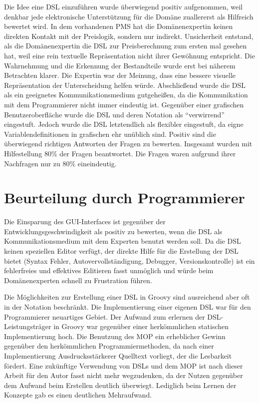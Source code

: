 \documentclass[11pt,english,ngerman, headsepline]{scrreprt}
\begin{document}
Die Idee eine DSL einzuführen wurde überwiegend positiv aufgenommen, weil
denkbar jede elektronische Unterstützung für die Domäne zuallererst als
Hilfreich bewertet wird.
In dem vorhandenen PMS hat die Domänenexpertin keinen direkten Kontakt mit der
Preislogik, sondern nur indirekt.
Unsicherheit entstand, als die Domänenexpertin die DSL zur Preisberechnung
 zum ersten mal gesehen hat, weil eine
rein textuelle Repräsentation nicht ihrer Gewöhnung entspricht. Die Wahrnehmung
und die Erkennung der Bestandteile wurde erst bei näherem Betrachten klarer. 
Die Expertin war der Meinung, dass eine bessere visuelle Repräsentation der
Unterscheidung helfen würde. Abschließend wurde die DSL als ein geeignetes
Kommunikationsmedium gutgeheißen, da die Kommunikation mit dem Programmierer nicht immer eindeutig ist.
Gegenüber einer grafischen Benutzeroberfläche wurde die DSL und deren Notation
als ``verwirrend'' eingestuft. Jedoch wurde die DSL letztendlich als flexibler
eingestuft, da eigne Variablendefinitionen in grafischen ehr unüblich sind.
Positiv sind die überwiegend richtigen Antworten der Fragen zu bewerten.
Insgesamt wurden mit Hilfestellung 80\% der Fragen beantwortet. Die Fragen waren
aufgrund ihrer Nachfragen nur zu 80\% eineindeutig.



\section{Beurteilung durch Programmierer}
 
Die Einsparung des GUI-Interfaces ist gegenüber der Entwicklungsgeschwindigkeit
als positiv zu bewerten, wenn die DSL als Kommunikationsmedium mit dem Experten
benutzt werden soll. 
Da die DSL keinen speziellen Editor verfügt, der direkte Hilfe für die
Erstellung der DSL bietet (Syntax Fehler, Autovervollständigung, Debugger,
Versionskontrolle) ist ein fehlerfreies und effektives Editieren fasst unmöglich
und würde beim Domänenexperten schnell zu Frustration führen. 

Die Möglichkeiten zur Erstellung einer DSL in Groovy sind ausreichend aber oft
in der Notation beschränkt. 
Die Implementierung einer eigenen DSL war für den Programmierer neuartiges
Gebiet. Der Aufwand zum erlernen der DSL-Leistungsträger in Groovy war gegenüber
einer herkömmlichen statischen Implementierung hoch. Die Benutzung des MOP ein
erheblicher Gewinn gegenüber den herkömmlichen Programmiermethoden, da nach
einer Implementierung Ausdrucksstärkerer Quelltext vorliegt, der die Lesbarkeit
fördert.
Eine zukünftige Verwendung von DSLs und dem MOP ist nach dieser Arbeit für den
Autor fasst nicht mehr wegzudenken, da der Nutzen gegenüber dem Aufwand beim 
Erstellen deutlich überwiegt. Lediglich beim Lernen der Konzepte gab es
einen deutlichen Mehraufwand.
 
\end{document}

